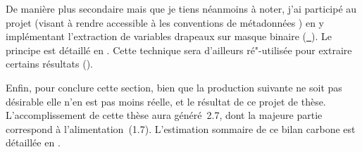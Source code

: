 De manière plus secondaire mais que je tiens néanmoins à noter, j'ai participé au projet  (visant à rendre accessible à  les conventions de métadonnées ) en y implémentant l'extraction de variables drapeaux sur masque binaire (\href{https://github.com/xarray-contrib/cf-xarray/pull/354}{~}).
Le principe est détaillé en .
Cette technique sera d'ailleurs ré"-utilisée pour extraire certains résultats ().

\bigskip

Enfin, pour conclure cette section, bien que la production suivante ne soit pas désirable elle n'en est pas moins réelle, et le résultat de ce projet de thèse.
L'accomplissement de cette thèse aura généré~\qty{2.7}{\tcarbone}, dont la majeure partie correspond à l'alimentation~(\qty{1.7}{\tcarbone}).
L'estimation sommaire de ce bilan carbone est détaillée en .
